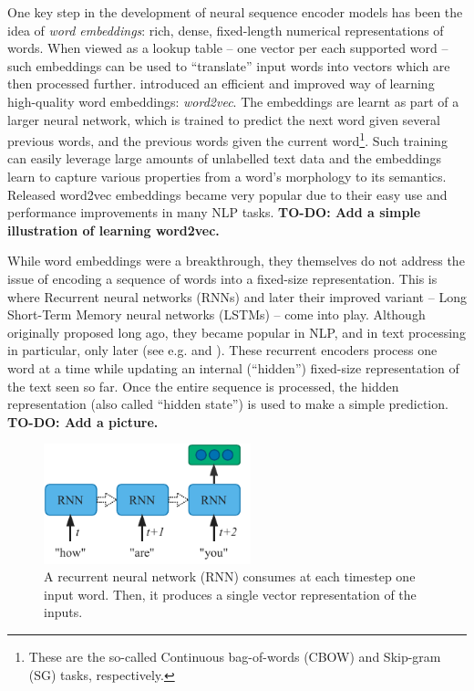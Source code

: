 \documentclass[bsc,frontabs,twoside,singlespacing,parskip,deptreport]{infthesis}
\begin{document}
{{    One key step in the development of neural sequence encoder models has been the idea of \textit{word embeddings}: rich, dense, fixed-length numerical representations of words. When viewed as a lookup table -- one vector per each supported word -- such embeddings can be used to ``translate'' input words into vectors which are then processed further.
    \citet{Mikolov_2013} introduced an efficient and improved way of learning high-quality word embeddings: \textit{word2vec}. The embeddings are learnt as part of a larger neural network, which is trained to predict the next word given several previous words, and the previous words given the current word\footnote{These are the so-called Continuous bag-of-words (CBOW) and Skip-gram (SG) tasks, respectively.}. Such training can easily leverage large amounts of unlabelled text data and the embeddings learn to capture various properties from a word's morphology to its semantics. Released word2vec embeddings became very popular due to their easy use and performance improvements in many NLP tasks.
    \textbf{TO-DO: Add a simple illustration of learning word2vec.}

    
    While word embeddings were a breakthrough, they themselves do not address the issue of encoding a sequence of words into a fixed-size representation. This is where Recurrent neural networks (RNNs) \citep{Rumelhart_1986} and later their improved variant -- Long Short-Term Memory neural networks (LSTMs) \citep{Hochreiter_Schmidhuber_1997} -- come into play. Although originally proposed long ago, they became popular in NLP, and in text processing in particular, only later (see e.g. \citet{Mikolov_2010} and \citet{Graves_2013}). These recurrent encoders process one word at a time while updating an internal (``hidden'') fixed-size representation of the text seen so far. Once the entire sequence is processed, the hidden representation (also called ``hidden state'') is used to make a simple prediction. \textbf{TO-DO: Add a picture.}
    \begin{figure}[h!t]
      \centering
      \includegraphics[width=6cm]{graphics/rnn}
      \caption{A recurrent neural network (RNN) consumes at each timestep one input word. Then, it produces a single vector representation of the inputs.}
      \label{fig:RNN}
    \end{figure}

}}
\end{document}
